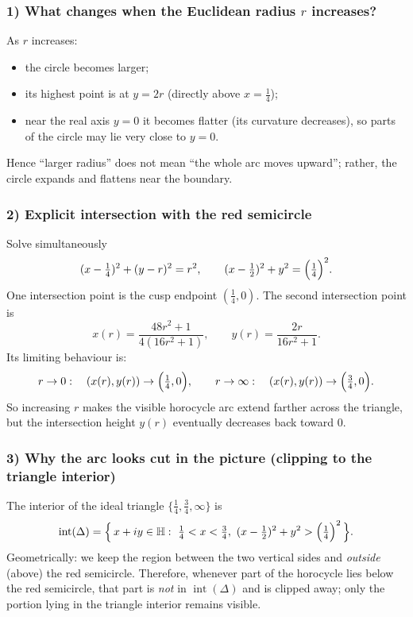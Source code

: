 \documentclass[12pt,a4paper]{article}
\newcommand{\HH}{\mathbb{H}}
\theoremstyle{plain}
\theoremstyle{definition}      %
\begin{document}
\subsubsection*{1) What changes when the Euclidean radius $r$ increases?}
As $r$ increases:
\begin{itemize}
	\item the circle becomes larger;
	\item its highest point is at $y=2r$ (directly above $x=\tfrac14$);
	\item near the real axis $y=0$ it becomes flatter (its curvature decreases), so parts of the circle may lie very close to $y=0$.
\end{itemize}
Hence ``larger radius'' does not mean ``the whole arc moves upward''; rather, the circle expands and flattens near the boundary.

\subsubsection*{2) Explicit intersection with the red semicircle}
Solve simultaneously
\[
(x-\tfrac14)^2+(y-r)^2=r^2,
\qquad
(x-\tfrac12)^2+y^2=\Bigl(\tfrac14\Bigr)^2.
\]
One intersection point is the cusp endpoint $(\tfrac14,0)$.
The second intersection point is
\[
x(r)=\frac{48r^2+1}{4(16r^2+1)},
\qquad
y(r)=\frac{2r}{16r^2+1}.
\]
Its limiting behaviour is:
\[
r\to 0:\quad (x(r),y(r))\to\Bigl(\tfrac14,0\Bigr),
\qquad
r\to\infty:\quad (x(r),y(r))\to\Bigl(\tfrac34,0\Bigr).
\]
So increasing $r$ makes the visible horocycle arc extend farther across the triangle, but the intersection height $y(r)$
eventually decreases back toward $0$.

\subsubsection*{3) Why the arc looks cut in the picture (clipping to the triangle interior)}
The interior of the ideal triangle $\{\tfrac14,\tfrac34,\infty\}$ is
\[
\operatorname{int}(\Delta)
=\Bigl\{\,x+iy\in\HH:\ \tfrac14<x<\tfrac34,\ (x-\tfrac12)^2+y^2>\Bigl(\tfrac14\Bigr)^2\,\Bigr\}.
\]
Geometrically: we keep the region between the two vertical sides and \emph{outside} (above) the red semicircle.
Therefore, whenever part of the horocycle lies below the red semicircle, that part is \emph{not} in $\operatorname{int}(\Delta)$
and is clipped away; only the portion lying in the triangle interior remains visible.


	
	
\end{document}
